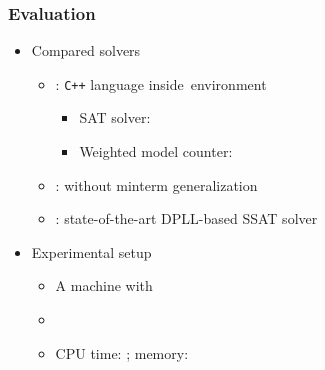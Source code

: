 \newcommand{\nrandom}{\num{700}}
\newcommand{\napplication}{\num{120}}
\newcommand{\nstrategic}{\num{60}}
\newcommand{\npec}{\num{60}}

\begin{frame}
    \frametitle{Evaluation}
    \begin{itemize}
        \item Compared solvers
              \pause
              \begin{itemize}
                  \item \ressat: \texttt{C++} language inside~\abc environment~\cite{ABC}
                        \pause
                        \begin{itemize}
                            \item SAT solver: ~\cite{Een2003Solver}
                                  \pause
                            \item Weighted model counter: \cachet~\cite{Sang2004}
                                  \pause
                        \end{itemize}
                  \item \ressatb: \ressat without minterm generalization
                        \pause
                  \item \dcssat: state-of-the-art DPLL-based SSAT solver
                        \pause
              \end{itemize}
        \item Experimental setup
              \pause
              \begin{itemize}
                  \item A machine with~\machineSpec
                        \pause
                  \item \osInfo
                        \pause
                  \item CPU time: \timelimit; memory: \memlimit
              \end{itemize}
    \end{itemize}
\end{frame}

